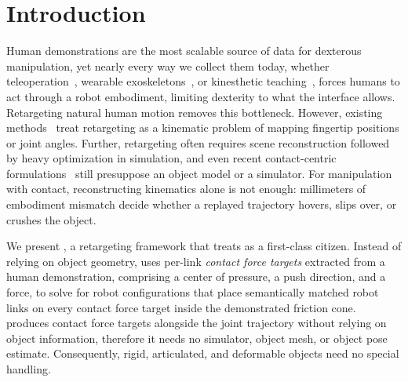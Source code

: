 \section{Introduction}
\label{sec:intro}
Human demonstrations are the most scalable source of data for dexterous manipulation, yet nearly every way we collect them today, whether teleoperation~\cite{aloha, wu2024gello, opentelevision}, wearable exoskeletons~\cite{umi, doglove, dexumi}, or kinesthetic teaching~\cite{sharma2025selfsupervised, chen2025dexforce}, forces humans to act through a robot embodiment, limiting dexterity to what the interface allows. Retargeting natural human motion removes this bottleneck. However, existing methods~\cite{dexpilot, anyteleop} treat retargeting as a kinematic problem of mapping fingertip positions or joint angles. Further, retargeting often requires scene reconstruction followed by heavy optimization in simulation, and even recent contact-centric formulations~\cite{contactretarget, contactanchored, hoiretarget} still presuppose an object model or a simulator. For manipulation with contact, reconstructing kinematics alone is not enough: millimeters of embodiment mismatch decide whether a replayed trajectory hovers, slips over, or crushes the object.




We present \ours, a retargeting framework that treats \fca as a first-class citizen. Instead of relying on object geometry, \ours uses per-link \emph{contact force targets} extracted from a human demonstration, comprising a center of pressure, a push direction, and a force, to solve for robot configurations that place semantically matched robot links on every contact force target inside the demonstrated friction cone. \ours produces contact force targets alongside the joint trajectory without relying on object information, therefore it needs no simulator, object mesh, or object pose estimate. Consequently, rigid, articulated, and deformable objects need no special handling.

